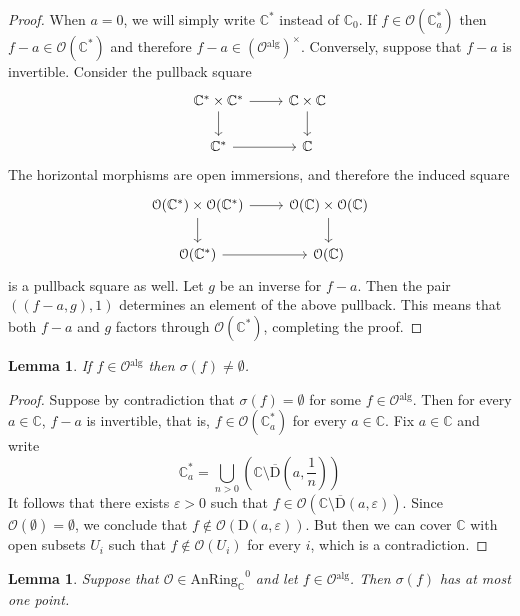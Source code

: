 \documentclass[12pt,a4paper,reqno]{amsart}
\theoremstyle{plain}
\newtheorem{lem}[thm]{Lemma}
\theoremstyle{definition}
\theoremstyle{remark}
\numberwithin{equation}{section}
\begin{document}
\begin{proof}
	When $a = 0$, we will simply write $\mathbb C^*$ instead of $\mathbb C_0$.
	If $f \in {\mathcal O}(\mathbb C^*_a)$ then $f - a \in {\mathcal O}(\mathbb C^*)$ and therefore $f-a \in ({\mathcal O}{^\mathrm{alg}})^\times$.
	Conversely, suppose that $f - a$ is invertible. Consider the pullback square
	\[ \begin{tikzcd}
	\mathbb C^* \times \mathbb C^* \arrow{r} \arrow{d} & \mathbb C \times \mathbb C \arrow{d} \\
	\mathbb C^* \arrow{r} & \mathbb C
	\end{tikzcd} \]
	The horizontal morphisms are open immersions, and therefore the induced square
	\[ \begin{tikzcd}
	{\mathcal O}(\mathbb C^*) \times {\mathcal O}(\mathbb C^*) \arrow{r} \arrow{d} & {\mathcal O}(\mathbb C) \times {\mathcal O}(\mathbb C) \arrow{d} \\
	{\mathcal O}(\mathbb C^*) \arrow{r} & {\mathcal O}(\mathbb C)
	\end{tikzcd} \]
	is a pullback square as well. Let $g$ be an inverse for $f - a$. Then the pair $((f-a, g), 1)$ determines an element of the above pullback. This means that both $f-a$ and $g$ factors through ${\mathcal O}(\mathbb C^*)$, completing the proof.
\end{proof}

\begin{lem}
	If $f \in {\mathcal O}{^\mathrm{alg}}$ then $\sigma(f) \ne \emptyset$.
\end{lem}

\begin{proof}
	Suppose by contradiction that $\sigma(f) = \emptyset$ for some $f \in {\mathcal O}{^\mathrm{alg}}$.
	Then for every $a \in \mathbb C$, $f - a$ is invertible, that is, $f \in {\mathcal O}(\mathbb C^*_a)$ for every $a \in \mathbb C$.
	Fix $a \in \mathbb C$ and write
	\[ \mathbb C^*_a = \bigcup_{n > 0} \left( \mathbb C \setminus \overline{\mathrm D}\left(a, \frac{1}{n}\right) \right) \]
	It follows that there exists $\varepsilon > 0$ such that $f \in {\mathcal O}(\mathbb C \setminus \overline{\mathrm D}(a, \varepsilon))$.
	Since ${\mathcal O}(\emptyset) = \emptyset$, we conclude that $f \not \in {\mathcal O}(\mathrm D(a, \varepsilon))$. But then we can cover $\mathbb C$ with open subsets $U_i$ such that $f \not \in {\mathcal O}(U_i)$ for every $i$, which is a contradiction.
\end{proof}

\begin{lem}
	Suppose that ${\mathcal O} \in {\mathrm{AnRing}_{\mathbb C}}^0$ and let $f \in {\mathcal O}{^\mathrm{alg}}$.
	Then $\sigma(f)$ has at most one point.
\end{lem}
\end{document}
